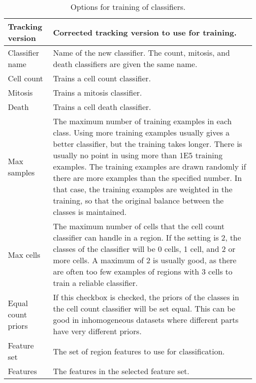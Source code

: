 \documentclass[a4paper, oneside, onecolumn, 11pt]{article}
\begin{document}
\begin{table}[!htb]
\caption{Options for training of classifiers.}
\label{tab:classifier-training}
\begin{tabularx}{\textwidth}{lX}
\hline
Tracking version & Corrected tracking version to use for training. \\[5pt] \hline

Classifier name & Name of the new classifier. The count, mitosis, and death classifiers are given the same name. \\[5pt] \hline

Cell count & Trains a cell count classifier. \\[5pt] \hline

Mitosis &  Trains a mitosis classifier. \\[5pt] \hline

Death &  Trains a cell death classifier. \\[5pt] \hline

Max samples & The maximum number of training examples in each class. Using more training examples usually gives a better classifier, but the training takes longer. There is usually no point in using more than 1E5 training examples. The training examples are drawn randomly if there are more examples than the specified number. In that case, the training examples are weighted in the training, so that the original balance between the classes is maintained. \\[5pt] \hline

Max cells & The maximum number of cells that the cell count classifier can handle in a region. If the setting is 2, the classes of the classifier will be 0 cells, 1 cell, and 2 or more cells. A maximum of 2 is usually good, as there are often too few examples of regions with 3 cells to train a reliable classifier. \\[5pt] \hline

Equal count priors & If this checkbox is checked, the priors of the classes in the cell count classifier will be set equal. This can be good in inhomogeneous datasets where different parts have very different priors. \\[5pt] \hline

Feature set & The set of region features to use for classification. \\[5pt] \hline

Features &  The features in the selected feature set. \\[5pt] \hline
\end{tabularx}
\end{table}
\end{document}

